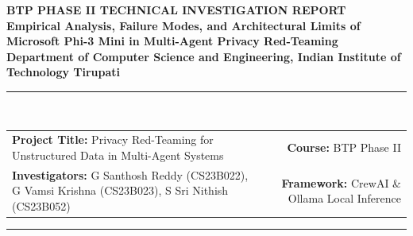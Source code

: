 \documentclass[10pt,a4paper]{article}
\begin{document}
\begin{center}
    {\Large \textbf{\textcolor{primaryblue}{BTP PHASE II TECHNICAL INVESTIGATION REPORT}}} \\[0.4em]
    {\LARGE \textbf{Empirical Analysis, Failure Modes, and Architectural Limits of\\Microsoft Phi-3 Mini in Multi-Agent Privacy Red-Teaming}} \\[0.8em]
    \textbf{Department of Computer Science and Engineering, Indian Institute of Technology Tirupati} \\[0.5em]
    \rule{\textwidth}{1pt} \\[0.5em]
    \begin{tabularx}{\textwidth}{Xr}
        \textbf{Project Title:} Privacy Red-Teaming for Unstructured Data in Multi-Agent Systems & \textbf{Course:} BTP Phase II \\
        \textbf{Investigators:} G Santhosh Reddy (CS23B022), G Vamsi Krishna (CS23B023), S Sri Nithish (CS23B052) & \textbf{Framework:} CrewAI \& Ollama Local Inference
    \end{tabularx}
    \rule{\textwidth}{0.5pt}
\end{center}

\vspace{0.5em}

\begin{abstract}
As part of the empirical benchmark evaluation required for BTP Phase II, multi-agent red-teaming pipelines were evaluated across three local large/small language model (LLM/SLM) backends: Meta Llama 3.2 (3B), Mistral (7B), and Microsoft Phi-3 Mini (3.8B). While Llama 3.2 and Mistral successfully executed the 30-run evaluation matrix with high task utility (73.3\%--80.0\%) and clear vulnerability dynamics, Microsoft Phi-3 Mini exhibited severe behavioral anomalies, technical incompatibilities, and architectural failure modes. Specifically, Phi-3 Mini failed under native CrewAI tool-calling protocols due to an upstream Ollama manifest deficiency (\texttt{HTTP 400: phi3 does not support tools}), suffered massive latency inflation (averaging 730.7 seconds per run compared to 137.9 seconds for Llama 3.2), and underwent catastrophic autoregressive attention collapse when chained through 6--7 sequential agents, producing non-terminating hallucinatory babble and a 0.0\% benign task success rate. This report provides a comprehensive, ground-up investigation of the technical root causes, mathematical mechanisms, runtime phenomena, and academic implications of these findings.
\end{abstract}
\end{document}
